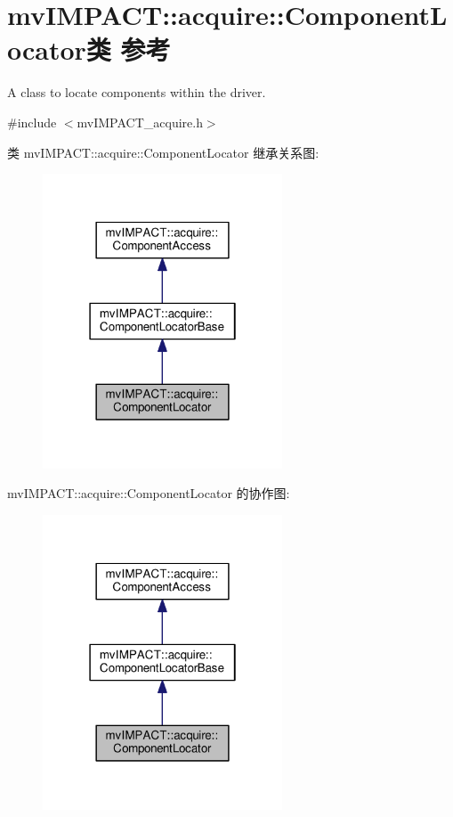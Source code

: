 \hypertarget{classmv_i_m_p_a_c_t_1_1acquire_1_1_component_locator}{\section{mv\+I\+M\+P\+A\+C\+T\+:\+:acquire\+:\+:Component\+Locator类 参考}
\label{classmv_i_m_p_a_c_t_1_1acquire_1_1_component_locator}
}


A class to locate components within the driver.  




{\ttfamily \#include $<$mv\+I\+M\+P\+A\+C\+T\+\_\+acquire.\+h$>$}



类 mv\+I\+M\+P\+A\+C\+T\+:\+:acquire\+:\+:Component\+Locator 继承关系图\+:
\nopagebreak
\begin{figure}[H]
\begin{center}
\leavevmode
\includegraphics[width=202pt]{classmv_i_m_p_a_c_t_1_1acquire_1_1_component_locator__inherit__graph}
\end{center}
\end{figure}


mv\+I\+M\+P\+A\+C\+T\+:\+:acquire\+:\+:Component\+Locator 的协作图\+:
\nopagebreak
\begin{figure}[H]
\begin{center}
\leavevmode
\includegraphics[width=202pt]{classmv_i_m_p_a_c_t_1_1acquire_1_1_component_locator__coll__graph}
\end{center}
\end{figure}
